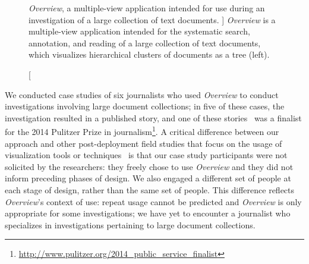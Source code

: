 
\begin{figure}
    \centering
    \caption
    [
        {\it Overview}, a multiple-view application intended for use during an investigation of a large collection of text documents.
    ]{
        {\it Overview} is a multiple-view application intended for the systematic search, annotation, and reading of a large collection of text documents, which visualizes hierarchical clusters of documents as a tree (left). 
    }
    \centering
    \label{fig:overview}
\end{figure}


We conducted case studies of six journalists who used {\it Overview} to conduct investigations involving large document collections; in five of these cases, the investigation resulted in a published story, and one of these stories~\cite{Playford2013} was a finalist for the 2014 Pulitzer Prize in journalism\footnote{\url{http://www.pulitzer.org/2014_public_service_finalist}}.
A critical difference between our approach and other post-deployment field studies that focus on the usage of visualization tools or techniques~\cite{Lloyd2011,Saraiya2006,Shneiderman2006} is that our case study participants were not solicited by the researchers: they freely chose to use {\it Overview} and they did not inform preceding phases of design. 
We also engaged a different set of people at each stage of design, rather than the same set of people. 
This difference reflects {\it Overview}'s context of use: repeat usage cannot be predicted and {\it Overview} is only appropriate for some investigations; we have yet to encounter a journalist who specializes in investigations pertaining to large document collections.

